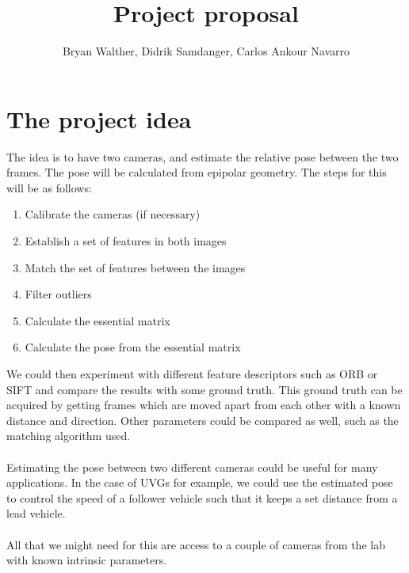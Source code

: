 \documentclass[12pt]{article}
\title{Project proposal}
\author{Bryan Walther, Didrik Samdanger, Carlos Ankour Navarro}
\begin{document}
\maketitle
\section*{The project idea}
The idea is to have two cameras, and estimate the relative pose between the two frames.
The pose will be calculated from epipolar geometry. The steps for this will be as follows:
\begin{enumerate}
    \item Calibrate the cameras (if necessary)
    \item Establish a set of features in both images
    \item Match the set of features between the images
    \item Filter outliers
    \item Calculate the essential matrix
    \item Calculate the pose from the essential matrix
\end{enumerate}

We could then experiment with different feature descriptors such as ORB or SIFT and compare the results with some ground truth.
This ground truth can be acquired by getting frames which are moved apart from each other with a known distance and direction.
Other parameters could be compared as well, such as the matching algorithm used.
\\ \\
Estimating the pose between two different cameras could be useful for many applications. 
In the case of UVGs for example, we could use the estimated pose to control the speed of a follower vehicle such that it keeps a set distance from a lead vehicle.
\\ \\
All that we might need for this are access to a couple of cameras from the lab with known intrinsic parameters.
\end{document}
